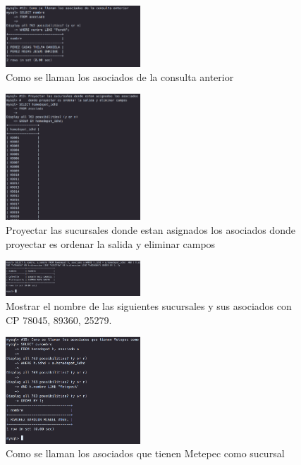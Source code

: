 \documentclass[12pt, fleqn]{article}                             %
\begin{document}
        \begin{figure}[ht!]
            \centering
            \includegraphics[width=0.45\textwidth]{BD3Reporte11}
            \caption{Como se llaman los asociados de la consulta anterior}
        \end{figure}

        \begin{figure}[ht!]
            \centering
            \includegraphics[width=0.45\textwidth]{BD3Reporte12}
            \caption{Proyectar las sucursales donde estan asignados los asociados
            donde proyectar es ordenar la salida y eliminar campos}
        \end{figure}

        \begin{figure}[ht!]
            \centering
            \includegraphics[width=0.45\textwidth]{BD3Reporte13}
            \caption{Mostrar el nombre de las siguientes sucursales y sus asociados con CP 78045, 89360, 25279.}
        \end{figure}


        \begin{figure}[ht!]
            \centering
            \includegraphics[width=0.45\textwidth]{BD3Reporte14}
            \caption{Como se llaman los asociados que tienen Metepec como sucursal}
        \end{figure}
\end{document}
